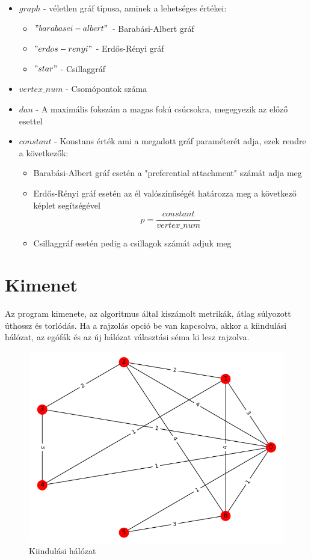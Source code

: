 \documentclass[12pt]{report}
\begin{document}
\begin{itemize}
	\item $graph$ - véletlen gráf típusa, aminek a lehetséges értékei:
	\begin{itemize}
		\item $"barabasei-albert"$ - Barabási-Albert gráf
		\item $"erdos-renyi"$ - Erdős-Rényi gráf
		\item $"star"$ - Csillaggráf
	\end{itemize}
	
	\item $vertex\_num$ - Csomópontok száma
	\item $dan$ - A maximális fokszám a magas fokú csúcsokra, megegyezik az előző esettel
	\item $constant$ - Konstans érték ami a megadott gráf paraméterét adja, ezek rendre a következők:
	\begin{itemize}
		\item Barabási-Albert gráf esetén a "preferential attachment" számát adja meg
		\item Erdős-Rényi gráf esetén az él valószínűségét határozza meg a következő képlet segítségével  \[p = \frac{constant}{vertex\_num}\]
		\item Csillaggráf esetén pedig a csillagok számát adjuk meg
	\end{itemize}
\end{itemize}




\section{Kimenet}

Az program kimenete, az algoritmus által kiszámolt metrikák, átlag súlyozott úthossz és torlódás. 
Ha a rajzolás opció be van kapcsolva, akkor a kiindulási hálózat, az egófák és az új hálózat választási séma ki lesz rajzolva.

\begin{figure}[H]
	\begin{center}
		\includegraphics[width=0.49\linewidth]{pictures/starting_network.png}
		\caption{Kiindulási hálózat}
		\label{starting-network}
	\end{center}
\end{figure}
\end{document}
